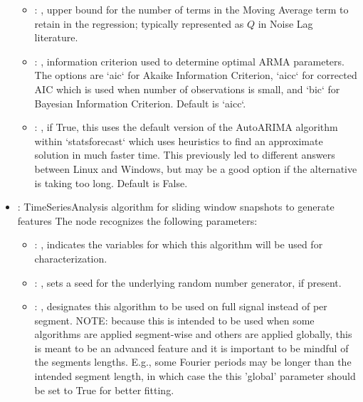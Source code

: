 \begin{itemize}
\begin{itemize}
        \item {}: ,
          upper bound for the number of terms in the Moving Average term to retain
          in the regression; typically represented as $Q$ in Noise Lag
          literature.

        \item {}: ,
          information criterion used to determine optimal ARMA parameters. The
          options are `aic` for Akaike Information Criterion, `aicc` for corrected AIC which
          is used when number of observations is small, and `bic` for Bayesian Information
          Criterion. Default is `aicc`.

        \item {}: ,
          if True, this uses the default version of the AutoARIMA algorithm                  within
          `statsforecast` which uses heuristics to find an approximate solution                  in
          much faster time. This previously led to different answers between Linux and
          Windows, but may be a good option if the alternative is taking too long.
          Default is False.
      \end{itemize}

    \item {}:
      TimeSeriesAnalysis algorithm for sliding window snapshots to generate features
      The  node recognizes the following parameters:
        \begin{itemize}
          \item {}: ,
            indicates the variables for which this algorithm will be used for characterization.
          \item {}: ,
            sets a seed for the underlying random number generator, if present.
          \item {}: ,
            designates this algorithm to be used on full signal instead of per
            segment. NOTE: because this is intended to be used when some algorithms are
            applied segment-wise and others are applied globally, this is meant to be an
            advanced feature and it is important to be mindful of the segments lengths.
            E.g., some Fourier periods may be longer than the intended segment length, in
            which case the this 'global' parameter should be set to True for better
            fitting. 
      \end{itemize}


\end{itemize}
